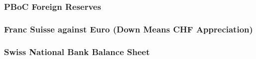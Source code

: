 \documentclass{beamer}
\begin{document}
\begin{frame}
\frametitle{PBoC Foreign Reserves}
\end{frame}


\begin{frame}
\frametitle{Franc Suisse against Euro (Down Means CHF Appreciation)}
\end{frame}


\begin{frame}
\frametitle{Swiss National Bank Balance Sheet}
\end{frame}
\end{document}
